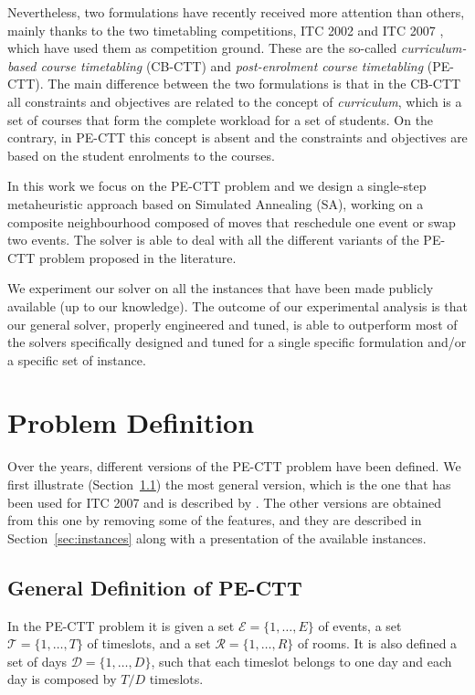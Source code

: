 \documentclass[authoryear,preprint,a4paper,12pt]{elsarticle}
\begin{document}
Nevertheless, two formulations have recently received more attention
than others, mainly thanks to the two timetabling competitions, ITC
2002 and ITC 2007 \citep{MSPM10}, which have used them as competition
ground.  These are the so-called \emph{curriculum-based course
  timetabling} (CB-CTT) and \emph{post-enrolment course timetabling}
(PE-CTT). The main difference between the two formulations is that in
the CB-CTT all constraints and objectives are related to the concept
of \emph{curriculum}, which is a set of courses that form the
complete workload for a set of students. On the contrary, in PE-CTT
this concept is absent and the constraints and objectives are based on
the student enrolments to the courses.

In this work we focus on the PE-CTT problem and we design a
single-step metaheuristic approach based on Simulated Annealing (SA),
working on a composite neighbourhood composed of moves that reschedule
one event or swap two events. The solver is able to deal with all the
different variants of the PE-CTT problem proposed in the literature.

We experiment our solver on all the instances that have been made
publicly available (up to our knowledge).  The outcome of our
experimental analysis is that our general solver, properly engineered
and tuned, is able to outperform most of the solvers specifically
designed and tuned for a single specific formulation and/or a specific
set of instance.

\section{Problem Definition}

Over the years, different versions of the PE-CTT problem have been
defined. We first illustrate (Section~\ref{sec:definition}) the most
general version, which is the one that has been used for ITC 2007
and is described by \citet{LePM07}.
The other versions are obtained from this one by removing some of the
features, and they are described in Section~\ref{sec:instances} along
with a presentation of the available instances.

\subsection{General Definition of PE-CTT}
\label{sec:definition}

In the PE-CTT problem it is given a set $\mathcal{E} = \{ 1, \dots, E\}$ of events, a set
$\mathcal{T} = \{ 1, \dots, T\}$ of timeslots, and a set $\mathcal{R} = \{ 1, \dots, R\}$ of rooms. It is
also defined a set of days $\mathcal{D} = \{ 1, \dots, D\}$, such that each timeslot
belongs to one day and each day is composed by
$T/D$ timeslots.
\end{document}
